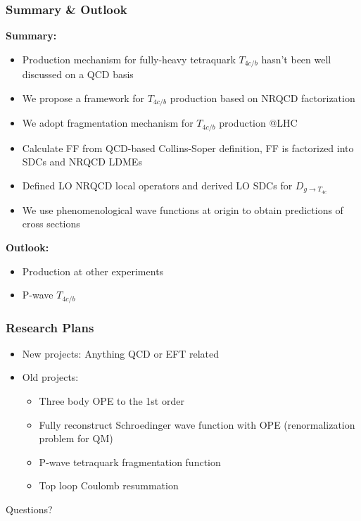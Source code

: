 \begin{frame}
  \frametitle{Summary \& Outlook}
  {\bf Summary: }
  \begin{itemize}
    \item Production mechanism for fully-heavy tetraquark $T_{4c/b}$ hasn't been well discussed on a QCD basis
    \item We propose a framework for $T_{4c/b}$ production based on NRQCD factorization
    \item We adopt fragmentation mechanism for $T_{4c/b}$ production @LHC
    \item Calculate FF from QCD-based Collins-Soper definition, FF is factorized into SDCs and NRQCD LDMEs
    \item Defined LO NRQCD local operators and derived LO SDCs for $D_{g \rightarrow T_{4c}}$
    \item We use phenomenological wave functions at origin to obtain predictions of cross sections
  \end{itemize}
  {\bf Outlook: }
  \begin{itemize}
    \item Production at other experiments
    \item P-wave $T_{4c/b}$
  \end{itemize}

\end{frame}

\begin{frame}
	\frametitle{Research Plans}
	\Large
	\begin{itemize}
		\item New projects: 
		Anything QCD or EFT related
		\item Old projects: 
		\begin{itemize}
			\item Three body OPE to the 1st order 
			\item Fully reconstruct Schroedinger wave function with OPE (renormalization problem for QM)
			\item P-wave tetraquark fragmentation function 
			\item Top loop Coulomb resummation
		\end{itemize}
	\end{itemize}

\end{frame}



\appendix
\begin{frame}[standout]
  \Huge Questions?
\end{frame}

